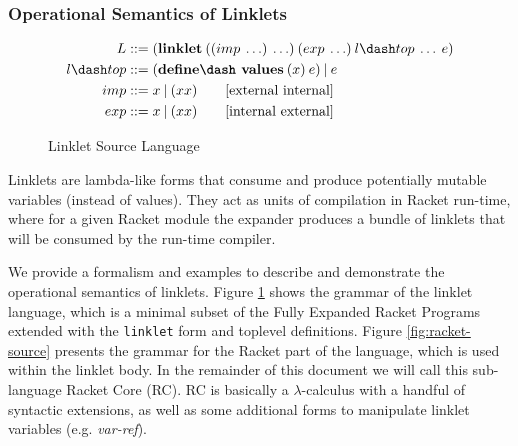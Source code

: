 \twocolumn

\subsubsection{Operational Semantics of Linklets}
\label{subsec:linklet-semantics}

\begin{figure}[tbp]
  \begin{mdframed}
    \begin{align*}
      L  &::= (\textbf{linklet}\:((imp\: \ldots)\: \ldots)\:(exp\: \ldots)\:l\dash top\:\ldots\:e)\\
      l\dash top &::= (\textbf{define\dash values}\:(x)\:e)\:|\:e \\
      imp &::= x\:|\:(x x) \tag*{[external internal]}\\
      exp &::= x\:|\:(x x) \tag*{[internal external]}
    \end{align*}
  \caption{Linklet Source Language}
  \label{fig:linklet-source}
  \end{mdframed}
\end{figure}

Linklets are lambda-like forms that consume and produce potentially
mutable variables (instead of values). They act as units of
compilation in Racket run-time, where for a given Racket module the
expander produces a bundle of linklets that will be consumed by the
run-time compiler.

We provide a formalism and examples to describe and demonstrate the
operational semantics of linklets. Figure \ref{fig:linklet-source}
shows the grammar of the linklet language, which is a minimal subset
of the Fully Expanded Racket Programs extended with the \verb|linklet|
form and toplevel definitions. Figure \ref{fig:racket-source} presents
the grammar for the Racket part of the language, which is used within
the linklet body. In the remainder of this document we will call this
sub-language Racket Core (RC). RC is basically a $\lambda$-calculus with a
handful of syntactic extensions, as well as some additional forms to
manipulate linklet variables (e.g. \emph{var-ref}).

